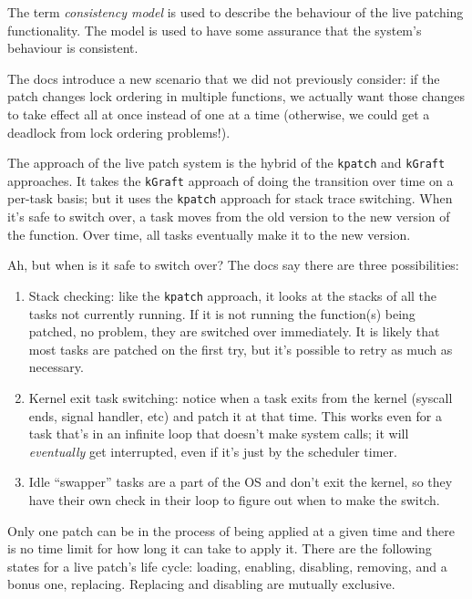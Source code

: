 The term \textit{consistency model} is used to describe the behaviour of the live patching functionality. The model is used to have some assurance that the system's behaviour is consistent. 

The docs introduce a new scenario that we did not previously consider: if the patch changes lock ordering in multiple functions, we actually want those changes to take effect all at once instead of one at a time (otherwise, we could get a deadlock from lock ordering problems!). 

The approach of the live patch system is the hybrid of the \texttt{kpatch} and \texttt{kGraft} approaches. It takes the \texttt{kGraft} approach of doing the transition over time on a per-task basis; but it uses the \texttt{kpatch} approach for stack trace switching. When it's safe to switch over, a task moves from the old version to the new version of the function. Over time, all tasks eventually make it to the new version. 

Ah, but when is it safe to switch over? The docs say there are three possibilities:
\begin{enumerate}
	\item Stack checking: like the \texttt{kpatch} approach, it looks at the stacks of all the tasks not currently running. If it is not running the function(s) being patched, no problem, they are switched over immediately. It is likely that most tasks are patched on the first try, but it's possible to retry as much as necessary.
	
	\item Kernel exit task switching: notice when a task exits from the kernel (syscall ends, signal handler, etc) and patch it at that time. This works even for a task that's in an infinite loop that doesn't make system calls; it will \textit{eventually} get interrupted, even if it's just by the scheduler timer.
	
	\item Idle ``swapper'' tasks are a part of the OS and don't exit the kernel, so they have their own check in their loop to figure out when to make the switch. 
\end{enumerate}

Only one patch can be in the process of being applied at a given time and there is no time limit for how long it can take to apply it. There are the following states for a live patch's life cycle: loading, enabling, disabling, removing, and a bonus one, replacing. Replacing and disabling are mutually exclusive.

